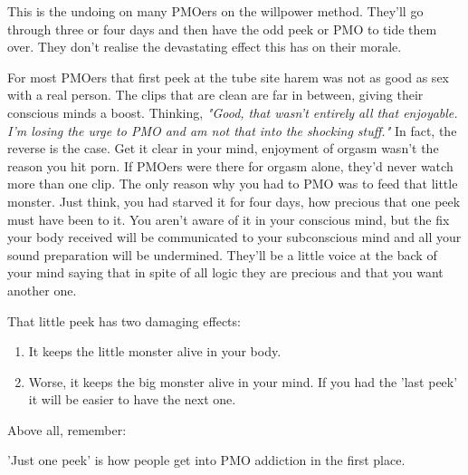 \documentclass[easypeasy.tex]{subfiles}
\begin{document}
This is the undoing on many PMOers on the willpower method. They'll go through three or four days and then have the odd peek or PMO to tide them over. They don't realise the devastating effect this has on their morale. 

For most PMOers that first peek at the tube site harem was not as good as sex with a real person. The clips that are clean are far in between, giving their conscious minds a boost. Thinking, \textit{"Good, that wasn't entirely all that enjoyable. I'm losing the urge to PMO and am not that into the shocking stuff."} In fact, the reverse is the case. Get it clear in your mind, enjoyment of orgasm wasn't the reason you hit porn. If PMOers were there for orgasm alone, they'd never watch more than one clip. The only reason why you had to PMO was to feed that little monster. Just think, you had starved it for four days, how precious that one peek must have been to it. You aren't aware of it in your conscious mind, but the fix your body received will be communicated to your subconscious mind and all your sound preparation will be undermined. They'll be a little voice at the back of your mind saying that in spite of all logic they are precious and that you want another one.

That little peek has two damaging effects:
\begin{enumerate}
  \item It keeps the little monster alive in your body.
  \item Worse, it keeps the big monster alive in your mind. If you had the 'last peek' it will be easier to have the next one.
\end{enumerate}

Above all, remember:

  {\huge 'Just one peek' is how people get into PMO addiction in the first place.}
\end{document}
